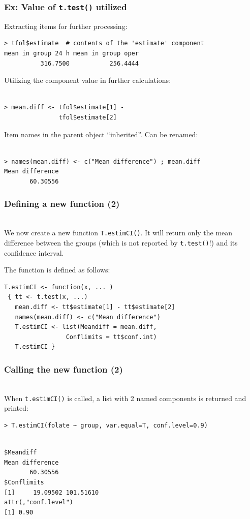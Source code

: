 \documentclass[handout,12pt]{beamer}
\begin{document}
\begin{frame}[fragile]
\frametitle{Ex: Value of {\tt t.test()} utilized}

\bi
\item
Extracting items for further processing: 
\footnotesize
\begin{verbatim}
> tfol$estimate  # contents of the 'estimate' component
mean in group 24 h mean in group oper
          316.7500           256.4444 
\end{verbatim}
\normalsize
\medskip
\item
Utilizing the component value in further calculations:
\small
\begin{verbatim}

> mean.diff <- tfol$estimate[1] - 
               tfol$estimate[2] 
\end{verbatim}
\normalsize 
\medskip
\item
Item names in the parent object ``inherited''. Can be renamed:
\small 
\begin{verbatim}     

> names(mean.diff) <- c("Mean difference") ; mean.diff 
Mean difference
       60.30556 
\end{verbatim}
\ei
\normalsize
\end{frame} 

\begin{frame}[fragile]
\frametitle{Defining a new function (2)}
\ \\
We now create a new function {\tt T.estimCI()}. It will return
 only the mean difference between the groups (which is not reported by {\tt t.test()}!) and its confidence interval.
 
\medskip
The function is defined as follows: 
 
\begin{verbatim}
T.estimCI <- function(x, ... )
 { tt <- t.test(x, ...)
   mean.diff <- tt$estimate[1] - tt$estimate[2]
   names(mean.diff) <- c("Mean difference")
   T.estimCI <- list(Meandiff = mean.diff, 
                 Conflimits = tt$conf.int)
   T.estimCI }  
\end{verbatim}
\end{frame}


\begin{frame}[fragile]
\frametitle{Calling the new function (2)}

\ \\
When {\tt t.estimCI()} is called, 
a list with 2 named components is returned and printed:
\small
\begin{verbatim}
> T.estimCI(folate ~ group, var.equal=T, conf.level=0.9)
\end{verbatim}
\small
\begin{verbatim}

$Meandiff
Mean difference 
       60.30556 
$Conflimits
[1]     19.09502 101.51610
attr(,"conf.level")
[1] 0.90
\end{verbatim}
\normalsize
\end{frame}
\end{document}
